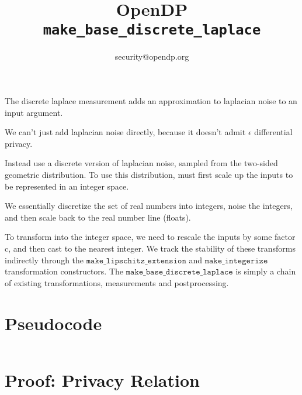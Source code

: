 

\title{OpenDP \texttt{make\_base\_discrete\_laplace}}
\author{security@opendp.org}





\maketitle

The discrete laplace measurement adds an approximation to laplacian noise to an input argument.

We can't just add laplacian noise directly, because it doesn't admit $\epsilon$ differential privacy.

Instead use a discrete version of laplacian noise, sampled from the two-sided geometric distribution.
To use this distribution, must first scale up the inputs to be represented in an integer space.

We essentially discretize the set of real numbers into integers, noise the integers, and then scale back to the real number line (floats).

To transform into the integer space, we need to rescale the inputs by some factor c, and then cast to the nearest integer.
We track the stability of these transforms indirectly through the $\texttt{make\_lipschitz\_extension}$ and $\texttt{make\_integerize}$ transformation constructors.
The $\texttt{make\_base\_discrete\_laplace}$ is simply a chain of existing transformations, measurements and postprocessing.


\section{Pseudocode}
\label{sec:python-pseudocode}

\inputminted{python}{pseudocode.py}

\section{Proof: Privacy Relation}


